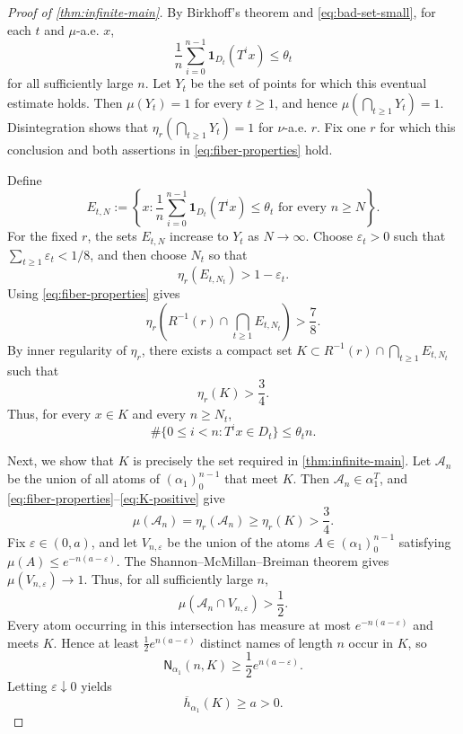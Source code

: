 \documentclass[10pt,a4paper]{amsart}
\newcommand{\cA}{\mathcal A}
\newcommand{\Nname}{\mathsf N}
\numberwithin{equation}{section}
\begin{document}
\begin{proof}[Proof of \cref{thm:infinite-main}]
		By Birkhoff's theorem and \eqref{eq:bad-set-small}, for each $t$ and
		$\mu$-a.e. $x$,
		\[
		\frac1n\sum_{i=0}^{n-1}\mathbf1_{D_t}(T^ix)\leq\theta_t
		\]
		for all sufficiently large $n$.  Let $Y_t$ be the set of points for which
		this eventual estimate holds.  Then $\mu(Y_t)=1$ for every $t \geq 1$, and hence
		$\mu(\bigcap_{t\geq 1} Y_t)=1$.  Disintegration shows that
		$\eta_r(\bigcap_{t\geq1}Y_t)=1$ for $\nu$-a.e. $r$.  Fix one $r$ for which
		this conclusion and both assertions in \eqref{eq:fiber-properties} hold.
		
		Define
		\[
		E_{t,N}
		:=
		\left\{
		x:
		\frac1n\sum_{i=0}^{n-1}\mathbf1_{D_t}(T^ix)
		\leq\theta_t
		\text{ for every }n\geq N
		\right\}.
		\]
		For the fixed $r$, the sets $E_{t,N}$ increase to $Y_t$ as $N\to\infty$.
		Choose $\varepsilon_t>0$ such that
		$\sum_{t\geq1}\varepsilon_t<1/8$, and then choose $N_t$ so that
		\[
		\eta_r(E_{t,N_t})>1-\varepsilon_t.
		\]
		Using \eqref{eq:fiber-properties} gives
		\[
		\eta_r\left(
		R^{-1}(r)\cap\bigcap_{t\geq1}E_{t,N_t}
		\right)
		>\frac78.
		\]
		By inner regularity of
		$\eta_r$, there exists a compact set $K \subset R^{-1}(r)\cap\bigcap_{t\geq1}E_{t,N_t}$ such that
		\begin{equation}
			\eta_r(K)>\frac34.
			\label{eq:K-positive}
		\end{equation}
		Thus, for every $x\in K$ and every $n\geq N_t$,
		\begin{equation}
			\#\{0\leq i<n:T^ix\in D_t\}
			\leq\theta_tn.
			\label{eq:uniform-bad-frequency}
		\end{equation}
		
		
		Next, we show that $K$ is precisely the set required in \cref{thm:infinite-main}. Let
		$\cA_n$ be the union of all atoms of $(\alpha_1)_0^{n-1}$ that meet
		$K$. Then $\cA_n\in\alpha_1^T$, and
		\eqref{eq:fiber-properties}--\eqref{eq:K-positive} give
		\begin{equation}
			\mu(\cA_n)=\eta_r(\cA_n)\geq\eta_r(K)>\frac34.
			\label{eq:A-large}
		\end{equation}
		Fix $\varepsilon\in(0,a)$, and let $V_{n,\varepsilon}$ be the union of the
		atoms $A\in(\alpha_1)_0^{n-1}$ satisfying
		$\mu(A)\leq e^{-n(a-\varepsilon)}$.  The
		Shannon--McMillan--Breiman theorem gives
		$\mu(V_{n,\varepsilon})\to1$.  Thus, for all sufficiently large $n$,
		\[
		\mu(\cA_n\cap V_{n,\varepsilon})
		>\frac12.
		\]
		Every atom occurring in this intersection has measure at most
		$e^{-n(a-\varepsilon)}$ and meets $K$.  Hence at least
		$\frac12e^{n(a-\varepsilon)}$ distinct names of length $n$ occur in $K$, so
		\[
		\Nname_{\alpha_1}(n,K)
		\geq\frac12e^{n(a-\varepsilon)}.
		\]
		Letting $\varepsilon\downarrow0$ yields
		\begin{equation}
			\overline h_{\alpha_1}(K)\geq a>0.
			\label{eq:K-positive-name-entropy}
		\end{equation}
		

\end{proof}
\end{document}
